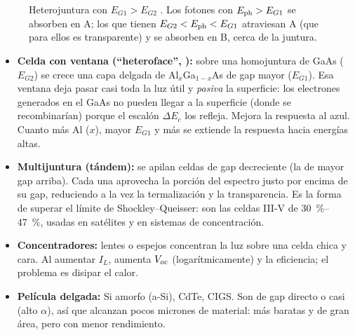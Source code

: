 \begin{figure}[H]
\centering
{}
\caption{Heterojuntura con $E_{G1}>E_{G2}$ . Los fotones con $E_{\mathrm{ph}}>E_{G1}$ se
absorben en A; los que tienen $E_{G2}<E_{\mathrm{ph}}<E_{G1}$ atraviesan A (que para ellos es
transparente) y se absorben en B, cerca de la juntura.}
\label{fig:hetero}
\end{figure}

\begin{itemize}
  \item \textbf{Celda con ventana (``heteroface'', ):} sobre una homojuntura de GaAs
  ($E_{G2}$) se crece una capa delgada de Al$_x$Ga$_{1-x}$As de gap mayor ($E_{G1}$). Esa
  ventana deja pasar casi toda la luz útil y \emph{pasiva} la superficie: los electrones
  generados en el GaAs no pueden llegar a la superficie (donde se recombinarían) porque
  el escalón $\Delta E_c$ los refleja. Mejora la respuesta al azul. Cuanto más Al ($x$),
  mayor $E_{G1}$ y más se extiende la respuesta hacia energías altas.
  \item \textbf{Multijuntura (tándem):} se apilan celdas de gap decreciente (la de mayor gap
  arriba). Cada una aprovecha la porción del espectro justo por encima de su gap, reduciendo a
  la vez la termalización y la transparencia. Es la forma de superar el límite de
  Shockley--Queisser: son las celdas III-V de \SIrange{30}{47}{\percent}, usadas en
  satélites y en sistemas de concentración.
  \item \textbf{Concentradores:} lentes o espejos concentran la luz sobre una celda chica y
  cara. Al aumentar $I_L$, aumenta $V_{oc}$ (logarítmicamente) y la eficiencia; el problema es
  disipar el calor.
  \item \textbf{Película delgada:} Si amorfo (a-Si), CdTe, CIGS. Son de gap directo o casi
  (alto $\alpha$), así que alcanzan pocos micrones de material: más baratas y de gran área,
  pero con menor rendimiento.
\end{itemize}

